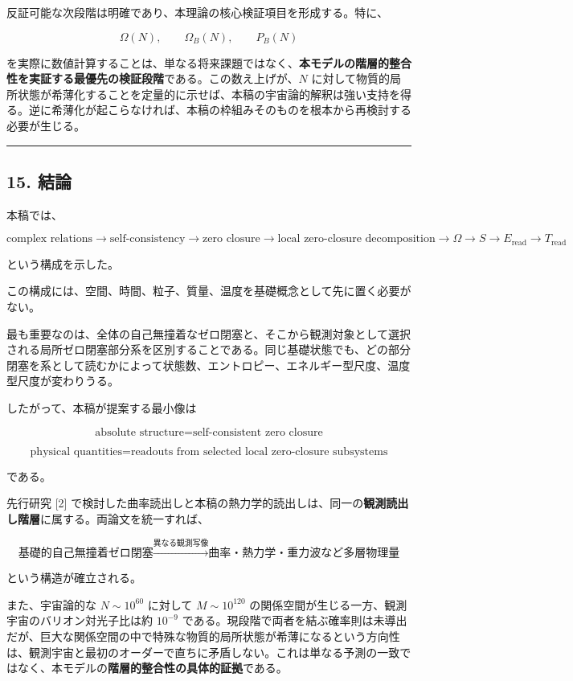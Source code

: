 \documentclass[
  a4paper,
]{ltjsarticle}
\begin{document}
反証可能な次段階は明確であり、本理論の核心検証項目を形成する。特に、

\[
\Omega(N),
\qquad
\Omega_B(N),
\qquad
P_B(N)
\]

を実際に数値計算することは、単なる将来課題ではなく、\textbf{本モデルの階層的整合性を実証する最優先の検証段階}である。この数え上げが、\(N\)
に対して物質的局所状態が希薄化することを定量的に示せば、本稿の宇宙論的解釈は強い支持を得る。逆に希薄化が起こらなければ、本稿の枠組みそのものを根本から再検討する必要が生じる。

\begin{center}\rule{0.5\linewidth}{0.5pt}\end{center}

\subsection{15. 結論}\label{ux7d50ux8ad6}

本稿では、

\[
\text{complex relations}
\rightarrow
\text{self-consistency}
\rightarrow
\text{zero closure}
\rightarrow
\text{local zero-closure decomposition}
\rightarrow
\Omega
\rightarrow
S
\rightarrow
E_{\mathrm{read}}
\rightarrow
T_{\mathrm{read}}
\]

という構成を示した。

この構成には、空間、時間、粒子、質量、温度を基礎概念として先に置く必要がない。

最も重要なのは、全体の自己無撞着なゼロ閉塞と、そこから観測対象として選択される局所ゼロ閉塞部分系を区別することである。同じ基礎状態でも、どの部分閉塞を系として読むかによって状態数、エントロピー、エネルギー型尺度、温度型尺度が変わりうる。

したがって、本稿が提案する最小像は

\[
\boxed{
\text{absolute structure}
=
\text{self-consistent zero closure}
}
\]

\[
\boxed{
\text{physical quantities}
=
\text{readouts from selected local zero-closure subsystems}
}
\]

である。

先行研究 {[}2{]}
で検討した曲率読出しと本稿の熱力学的読出しは、同一の\textbf{観測読出し階層}に属する。両論文を統一すれば、

\[
\boxed{
\text{基礎的自己無撞着ゼロ閉塞}}
\xrightarrow{\text{異なる観測写像}}
\boxed{
\text{曲率・熱力学・重力波など多層物理量}}
\]

という構造が確立される。

また、宇宙論的な \(N\sim10^{60}\) に対して \(M\sim10^{120}\)
の関係空間が生じる一方、観測宇宙のバリオン対光子比は約 \(10^{-9}\)
である。現段階で両者を結ぶ確率則は未導出だが、巨大な関係空間の中で特殊な物質的局所状態が希薄になるという方向性は、観測宇宙と最初のオーダーで直ちに矛盾しない。これは単なる予測の一致ではなく、本モデルの\textbf{階層的整合性の具体的証拠}である。
\end{document}
